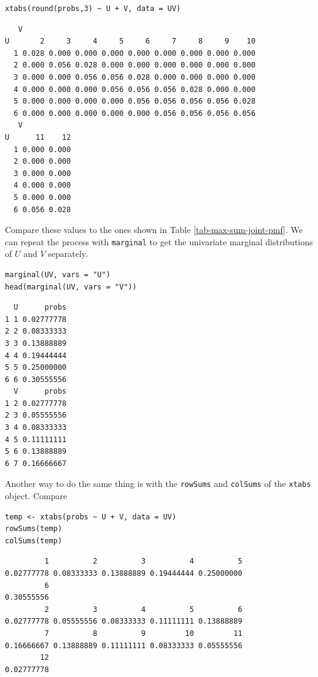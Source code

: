 \documentclass[captions=tableheading]{scrbook}
\begin{document}
\begin{verbatim}
xtabs(round(probs,3) ~ U + V, data = UV)
\end{verbatim}


\begin{verbatim}
   V
U       2     3     4     5     6     7     8     9    10
  1 0.028 0.000 0.000 0.000 0.000 0.000 0.000 0.000 0.000
  2 0.000 0.056 0.028 0.000 0.000 0.000 0.000 0.000 0.000
  3 0.000 0.000 0.056 0.056 0.028 0.000 0.000 0.000 0.000
  4 0.000 0.000 0.000 0.056 0.056 0.056 0.028 0.000 0.000
  5 0.000 0.000 0.000 0.000 0.056 0.056 0.056 0.056 0.028
  6 0.000 0.000 0.000 0.000 0.000 0.056 0.056 0.056 0.056
   V
U      11    12
  1 0.000 0.000
  2 0.000 0.000
  3 0.000 0.000
  4 0.000 0.000
  5 0.000 0.000
  6 0.056 0.028
\end{verbatim}

Compare these values to the ones shown in Table \ref{tab-max-sum-joint-pmf}. We can repeat the process with \texttt{marginal} to get the univariate marginal distributions of \(U\) and \(V\) separately.


\begin{verbatim}
marginal(UV, vars = "U")
head(marginal(UV, vars = "V"))
\end{verbatim}


\begin{verbatim}
  U      probs
1 1 0.02777778
2 2 0.08333333
3 3 0.13888889
4 4 0.19444444
5 5 0.25000000
6 6 0.30555556
  V      probs
1 2 0.02777778
2 3 0.05555556
3 4 0.08333333
4 5 0.11111111
5 6 0.13888889
6 7 0.16666667
\end{verbatim}

Another way to do the same thing is with the \texttt{rowSums} and \texttt{colSums} of the \texttt{xtabs} object. Compare


\begin{verbatim}
temp <- xtabs(probs ~ U + V, data = UV)
rowSums(temp)
colSums(temp)
\end{verbatim}


\begin{verbatim}
         1          2          3          4          5 
0.02777778 0.08333333 0.13888889 0.19444444 0.25000000 
         6 
0.30555556
         2          3          4          5          6 
0.02777778 0.05555556 0.08333333 0.11111111 0.13888889 
         7          8          9         10         11 
0.16666667 0.13888889 0.11111111 0.08333333 0.05555556 
        12 
0.02777778
\end{verbatim}
\end{document}
